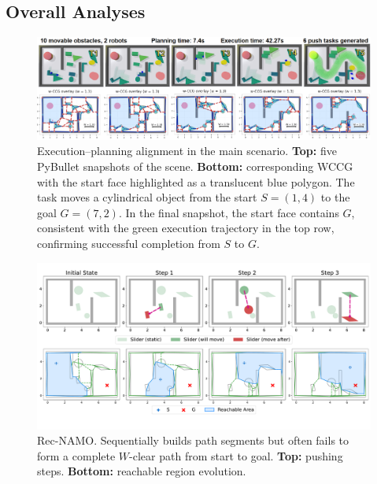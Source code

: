 \subsection{Overall Analyses}\label{subsec:overall}
\begin{figure}[t!]
  \centering
  \includegraphics[width=0.95\linewidth]{figures/sim_exp.png}
  \vspace{-2mm}
\caption{Execution--planning alignment in the main scenario. 
\textbf{Top:} five PyBullet snapshots of the scene. 
\textbf{Bottom:} corresponding WCCG with the start face highlighted as a translucent blue polygon.
The task moves a cylindrical object from the start \(S=(1,4)\) to the goal \(G=(7,2)\). 
In the final snapshot, the start face contains \(G\), 
consistent with the green execution trajectory in the top row, 
confirming successful completion from \(S\) to \(G\). 
}
 \vspace{-4mm}
\end{figure}
\begin{figure}
  \centering
  \vspace{-1mm}
  \includegraphics[width=0.95\columnwidth]{figures/Rec_NAMO.pdf}
  \vspace{-4mm}
  \caption{Rec-NAMO. Sequentially builds path segments but often fails to form a complete $W$-clear path from start to goal. \textbf{Top:} pushing steps. \textbf{Bottom:} reachable region evolution.}
  \vspace{-3mm}
  \label{fig:Rec-NAMO}
\end{figure}

